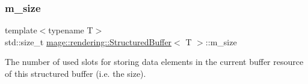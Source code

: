 \subsubsection{\texorpdfstring{m\+\_\+size}{m\_size}}
{\footnotesize\ttfamily template$<$typename T$>$ \\
std\+::size\+\_\+t \mbox{\hyperlink{classmage_1_1rendering_1_1_structured_buffer}{mage\+::rendering\+::\+Structured\+Buffer}}$<$ T $>$\+::m\+\_\+size\hspace{0.3cm}{\ttfamily [private]}}

The number of used slots for storing data elements in the current buffer resource of this structured buffer (i.\+e. the size). 